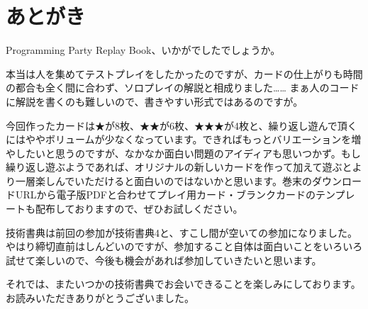 \documentclass[index]{subfiles}
\begin{document}
  \chapter*{あとがき}
  \label{ch:epilogue}

  Programming Party Replay Book、いかがでしたでしょうか。
  
  本当は人を集めてテストプレイをしたかったのですが、カードの仕上がりも時間の都合も全く間に合わず、ソロプレイの解説と相成りました…… まぁ人のコードに解説を書くのも難しいので、書きやすい形式ではあるのですが。
  
  今回作ったカードは★が8枚、★★が6枚、★★★が4枚と、繰り返し遊んで頂くにはややボリュームが少なくなっています。できればもっとバリエーションを増やしたいと思うのですが、なかなか面白い問題のアイディアも思いつかず。もし繰り返し遊ぶようであれば、オリジナルの新しいカードを作って加えて遊ぶとより一層楽しんでいただけると面白いのではないかと思います。巻末のダウンロードURLから電子版PDFと合わせてプレイ用カード・ブランクカードのテンプレートも配布しておりますので、ぜひお試しください。
  
  技術書典は前回の参加が技術書典4と、すこし間が空いての参加になりました。やはり締切直前はしんどいのですが、参加すること自体は面白いことをいろいろ試せて楽しいので、今後も機会があれば参加していきたいと思います。
  
  それでは、またいつかの技術書典でお会いできることを楽しみにしております。お読みいただきありがとうございました。
\end{document}
